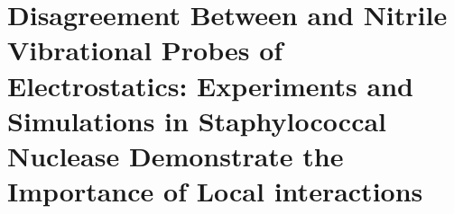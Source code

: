 \chapter{Disagreement Between \pKa{} and Nitrile Vibrational Probes of Electrostatics: Experiments and Simulations in Staphylococcal Nuclease Demonstrate the Importance of Local interactions}\label{snase}

\newcommand{\dpKa}{{\textDelta\pKa{}}}

%


